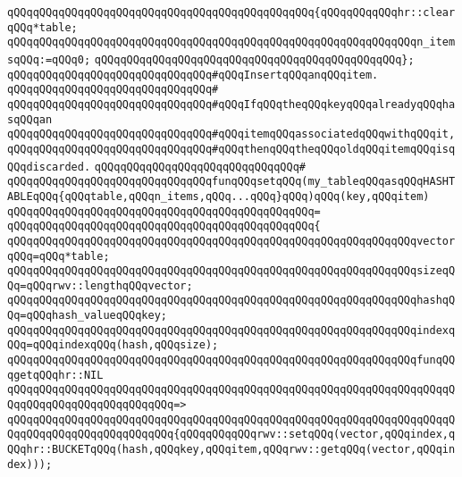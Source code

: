 \verb|qQQqqQQqqQQqqQQqqQQqqQQqqQQqqQQqqQQqqQQqqQQqqQQq{qQQqqQQqqQQqhr::clearqQQq*table;|\newline
\verb|qQQqqQQqqQQqqQQqqQQqqQQqqQQqqQQqqQQqqQQqqQQqqQQqqQQqqQQqqQQqqQQqn_itemsqQQq:=qQQq0;|\newline
\verb|qQQqqQQqqQQqqQQqqQQqqQQqqQQqqQQqqQQqqQQqqQQqqQQq};|\newline
\newline
\verb|qQQqqQQqqQQqqQQqqQQqqQQqqQQqqQQq#qQQqInsertqQQqanqQQqitem.|\newline
\verb|qQQqqQQqqQQqqQQqqQQqqQQqqQQqqQQq#|\newline
\verb|qQQqqQQqqQQqqQQqqQQqqQQqqQQqqQQq#qQQqIfqQQqtheqQQqkeyqQQqalreadyqQQqhasqQQqan|\newline
\verb|qQQqqQQqqQQqqQQqqQQqqQQqqQQqqQQq#qQQqitemqQQqassociatedqQQqwithqQQqit,|\newline
\verb|qQQqqQQqqQQqqQQqqQQqqQQqqQQqqQQq#qQQqthenqQQqtheqQQqoldqQQqitemqQQqisqQQqdiscarded.|\newline
\verb|qQQqqQQqqQQqqQQqqQQqqQQqqQQqqQQq#|\newline
\verb|qQQqqQQqqQQqqQQqqQQqqQQqqQQqqQQqfunqQQqsetqQQq(my_tableqQQqasqQQqHASHTABLEqQQq{qQQqtable,qQQqn_items,qQQq...qQQq}qQQq)qQQq(key,qQQqitem)|\newline
\verb|qQQqqQQqqQQqqQQqqQQqqQQqqQQqqQQqqQQqqQQqqQQqqQQq=|\newline
\verb|qQQqqQQqqQQqqQQqqQQqqQQqqQQqqQQqqQQqqQQqqQQqqQQq{|\newline
\verb|qQQqqQQqqQQqqQQqqQQqqQQqqQQqqQQqqQQqqQQqqQQqqQQqqQQqqQQqqQQqqQQqvectorqQQq=qQQq*table;|\newline
\verb|qQQqqQQqqQQqqQQqqQQqqQQqqQQqqQQqqQQqqQQqqQQqqQQqqQQqqQQqqQQqqQQqsizeqQQq=qQQqrwv::lengthqQQqvector;|\newline
\verb|qQQqqQQqqQQqqQQqqQQqqQQqqQQqqQQqqQQqqQQqqQQqqQQqqQQqqQQqqQQqqQQqhashqQQq=qQQqhash_valueqQQqkey;|\newline
\verb|qQQqqQQqqQQqqQQqqQQqqQQqqQQqqQQqqQQqqQQqqQQqqQQqqQQqqQQqqQQqqQQqindexqQQq=qQQqindexqQQq(hash,qQQqsize);|\newline
\newline
\verb|qQQqqQQqqQQqqQQqqQQqqQQqqQQqqQQqqQQqqQQqqQQqqQQqqQQqqQQqqQQqqQQqfunqQQqgetqQQqhr::NIL|\newline
\verb|qQQqqQQqqQQqqQQqqQQqqQQqqQQqqQQqqQQqqQQqqQQqqQQqqQQqqQQqqQQqqQQqqQQqqQQqqQQqqQQqqQQqqQQqqQQqqQQq=>|\newline
\verb|qQQqqQQqqQQqqQQqqQQqqQQqqQQqqQQqqQQqqQQqqQQqqQQqqQQqqQQqqQQqqQQqqQQqqQQqqQQqqQQqqQQqqQQqqQQqqQQq{qQQqqQQqqQQqrwv::setqQQq(vector,qQQqindex,qQQqhr::BUCKETqQQq(hash,qQQqkey,qQQqitem,qQQqrwv::getqQQq(vector,qQQqindex)));|\newline
